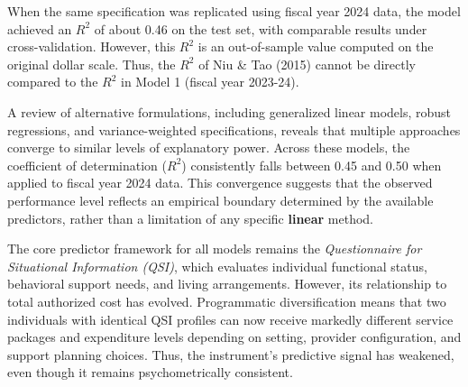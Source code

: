 When the same specification was replicated using fiscal year 2024 data, the model achieved an $R^2$ of about 0.46 on the test set, with comparable results under cross-validation. However, this  $R^2$ is an out-of-sample value computed on the original dollar scale. Thus, the $R^2$ of Niu \& Tao (2015) cannot be directly compared to the $R^2$ in Model 1 (fiscal year 2023-24). 

A review of alternative formulations, including generalized linear models, robust regressions, and variance-weighted specifications, reveals that multiple approaches converge to similar levels of explanatory power.  
Across these models, the coefficient of determination ($R^2$) consistently falls between 0.45 and 0.50 when applied to fiscal year 2024 data.  This convergence suggests that the observed performance level reflects an empirical boundary determined by the available predictors, rather than a limitation of any specific \textbf{linear} method.

The core predictor framework for all models remains the \textit{Questionnaire for Situational Information (QSI)}, which evaluates individual functional status, behavioral support needs, and living arrangements.  %
However, its relationship to total authorized cost has evolved.  Programmatic diversification means that two individuals with identical QSI profiles can now receive markedly different service packages and expenditure levels depending on setting, provider configuration, and support planning choices.  Thus, the instrument's predictive signal has weakened, even though it remains psychometrically consistent.




